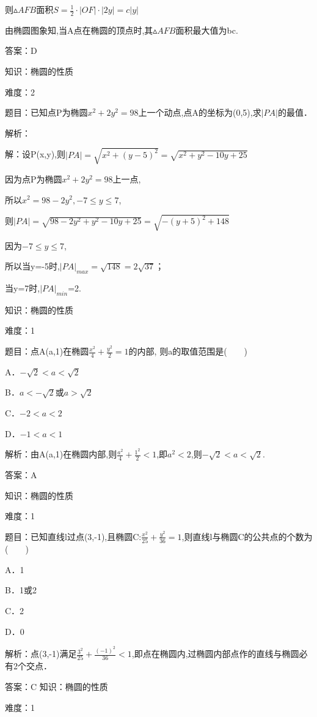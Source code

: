 \documentclass{article} %
\begin{document}
则${\vartriangle}AFB$面积$S=\frac{1}{2}\cdot |OF|\cdot |2y|=c|y|$

由椭圆图象知,当A点在椭圆的顶点时,其${\vartriangle}AFB$面积最大值为bc.

答案：D



知识：椭圆的性质

难度：2

题目：已知点P为椭圆$x^{2}+2y^{2}=98$上一个动点,点A的坐标为(0,5),求$|PA|$的最值．

解析：

解：设P(x,y),则$|PA|=\sqrt{x^2+(y-5)^2}=\sqrt{x^2+y^2-10y+25}$

因为点P为椭圆$x^{2}+2y^{2}=98$上一点,

所以$x^{2}=98-2y^{2},-7{\le}y{\le}7$,

则$|PA|=\sqrt{98-2y^2+y^2-10y+25}=\sqrt{-(y+5)^2+148}$

因为$-7{\le}y{\le}7$,

所以当y=-5时,$|PA|_{max}=\sqrt{148}=2\sqrt{37}$；

当y=7时,$|PA|_{min}$=2.

\noindent 

知识：椭圆的性质

难度：1

题目：点A(a,1)在椭圆$\frac{x^2}{4}+\frac{y^2}{2}=1$的内部, 则a的取值范围是(　　)

A．$-\sqrt{2}<a<\sqrt{2}$   

B．$a<-\sqrt{2}$或$a>\sqrt{2}$

C．$-2<a<2$   

D．$-1<a<1$

解析：由A(a,1)在椭圆内部,则$\frac{a^2}{4}+\frac{1^2}{2}<1$,即$a^{2}<2$,则$-\sqrt{2}<a<\sqrt{2}$.

答案：A



知识：椭圆的性质

难度：1

题目：已知直线l过点(3,-1),且椭圆C:$\frac{x^2}{25}+\frac{y^2}{36}=1$,则直线l与椭圆C的公共点的个数为(　　)

A．1  

B．1或2  

C．2  

D．0

解析：点(3,-1)满足$\frac{3^2}{25}+\frac{(-1)^2}{36}<1$,即点在椭圆内,过椭圆内部点作的直线与椭圆必有2个交点．

答案：C
知识：椭圆的性质

难度：1
\end{document}
